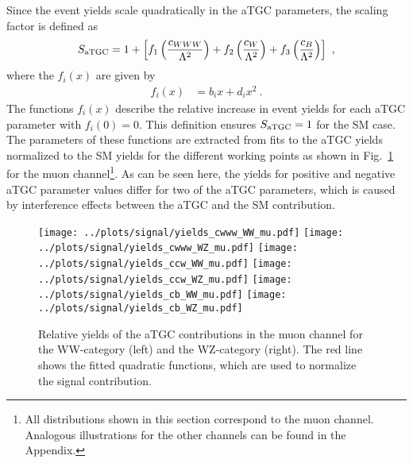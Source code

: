 Since the event yields scale quadratically in the aTGC parameters, the scaling factor is defined as
\begin{equation}
S_{\rm aTGC} = 1 + \left[ f_1\left(\frac{c_{WWW}}{\Lambda^2}\right) + f_2\left(\frac{c_{W}}{\Lambda^2}\right) + f_3\left(\frac{c_{B}}{\Lambda^2}\right) \right] ~,
\end{equation}
where the $f_i(x)$ are given by
\begin{align}
f_i(x) &= b_i x + d_i x^2 ~. \label{eq:signal:scale}
\end{align}
The functions $f_i(x)$ describe the relative increase in event yields for each aTGC parameter with $f_i(0)=0$. This definition ensures $S_{\rm aTGC}=1$ for the SM case. The parameters of these functions are extracted from fits to the aTGC yields normalized to the SM yields for the different working points as shown in Fig.~\ref{fig:signal:atgcyields_mu} for the muon channel\footnote{All distributions shown in this section correspond to the muon channel. Analogous illustrations for the other channels can be found in the Appendix.}. As can be seen here, the yields for positive and negative aTGC parameter values differ for two of the aTGC parameters, which is caused by interference effects between the aTGC and the SM contribution. 






\begin{figure}
	\centering
		\texttt{[image: ../plots/signal/yields\_cwww\_WW\_mu.pdf]}
		\texttt{[image: ../plots/signal/yields\_cwww\_WZ\_mu.pdf]}
		\texttt{[image: ../plots/signal/yields\_ccw\_WW\_mu.pdf]}
		\texttt{[image: ../plots/signal/yields\_ccw\_WZ\_mu.pdf]}
		\texttt{[image: ../plots/signal/yields\_cb\_WW\_mu.pdf]}
		\texttt{[image: ../plots/signal/yields\_cb\_WZ\_mu.pdf]}
	\caption[Relative yields of the aTGC contributions in the muon channel]{Relative yields of the aTGC contributions in the muon channel for the WW-category (left) and the WZ-category (right). The red line shows the fitted quadratic functions, which are used to normalize the signal contribution.}
	\label{fig:signal:atgcyields_mu}
\end{figure}

